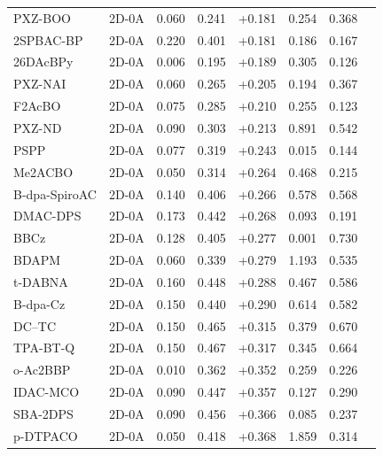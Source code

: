 \begin{longtable}{llcccccc}
PXZ-BOO & 2D-0A & 0.060 & 0.241 & +0.181 & 0.254 & 0.368 & \cite{doi101039D0TC03747H} \\
2SPBAC-BP & 2D-0A & 0.220 & 0.401 & +0.181 & 0.186 & 0.167 & \cite{doi101039D2TC03421B} \\
26DAcBPy & 2D-0A & 0.006 & 0.195 & +0.189 & 0.305 & 0.126 & \cite{doi101039C9TC04536H} \\
PXZ-NAI & 2D-0A & 0.060 & 0.265 & +0.205 & 0.194 & 0.367 & \cite{doi101016jorgel2020106012} \\
F2AcBO & 2D-0A & 0.075 & 0.285 & +0.210 & 0.255 & 0.123 & \cite{doi101016jcej2021133078} \\
PXZ-ND & 2D-0A & 0.090 & 0.303 & +0.213 & 0.891 & 0.542 & \cite{doi101039C9TC00503J} \\
PSPP & 2D-0A & 0.077 & 0.319 & +0.243 & 0.015 & 0.144 & \cite{doi101016jcplett2021138474} \\
Me2ACBO & 2D-0A & 0.050 & 0.314 & +0.264 & 0.468 & 0.215 & \cite{doi101016jcej2021133078} \\
B-dpa-SpiroAC & 2D-0A & 0.140 & 0.406 & +0.266 & 0.578 & 0.568 & \cite{doi101039D2TC02283D} \\
DMAC-DPS & 2D-0A & 0.173 & 0.442 & +0.268 & 0.093 & 0.191 & \cite{doi101039C6TC00418K} \\
BBCz & 2D-0A & 0.128 & 0.405 & +0.277 & 0.001 & 0.730 & \cite{doi101039D0TC01897J} \\
BDAPM & 2D-0A & 0.060 & 0.339 & +0.279 & 1.193 & 0.535 & \cite{doi101039C6TC04653C} \\
t-DABNA & 2D-0A & 0.160 & 0.448 & +0.288 & 0.467 & 0.586 & \cite{doi101016jmtener2021100792} \\
B-dpa-Cz & 2D-0A & 0.150 & 0.440 & +0.290 & 0.614 & 0.582 & \cite{doi101039D2TC02283D} \\
DC--TC & 2D-0A & 0.150 & 0.465 & +0.315 & 0.379 & 0.670 & \cite{doi101039C7TC05709A} \\
TPA-BT-Q & 2D-0A & 0.150 & 0.467 & +0.317 & 0.345 & 0.664 & \cite{doi101039C7TC05709A} \\
o-Ac2BBP & 2D-0A & 0.010 & 0.362 & +0.352 & 0.259 & 0.226 & \cite{doi101016jdyepig2023111104} \\
IDAC-MCO & 2D-0A & 0.090 & 0.447 & +0.357 & 0.127 & 0.290 & \cite{doi101016jorgel201803024} \\
SBA-2DPS & 2D-0A & 0.090 & 0.456 & +0.366 & 0.085 & 0.237 & \cite{doi101039C9TC03582F} \\
p-DTPACO & 2D-0A & 0.050 & 0.418 & +0.368 & 1.859 & 0.314 & \cite{doi101016jdyepig201610029} \\

\end{longtable}
